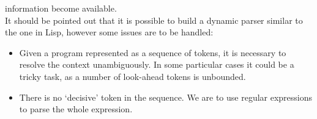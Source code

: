 information become available. \\
It should be pointed out that it is possible to build a dynamic parser similar
to the one in Lisp, however some issues are to be handled:
\begin{itemize}
    \item Given a program represented as a sequence of tokens, it is necessary
    to resolve the context unambiguously. In some particular cases it could be
    a tricky task, as a number of look-ahead tokens is unbounded.
    \item There is no `decisive' token in the sequence. We are to use regular
    expressions to parse the whole expression. 
\end{itemize}
